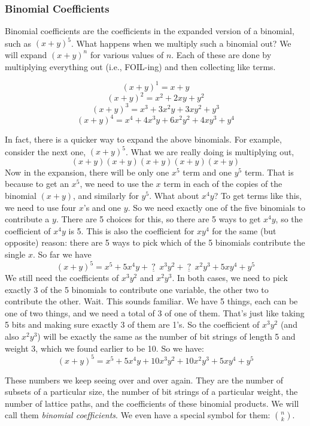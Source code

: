 \documentclass[12pt]{article}
\begin{document}
\subsubsection*{Binomial Coefficients}

Binomial coefficients are the coefficients in the expanded version of a binomial, such as $(x+y)^5$.  What happens when we multiply such a binomial out?  We will expand $(x+y)^n$ for various values of $n$.  Each of these are done by multiplying everything out (i.e., FOIL-ing) and then collecting like terms.

\[(x+y)^1 = x + y\]
\[(x+y)^2 = x^2 + 2xy + y^2\]
\[(x+y)^3 = x^3 + 3x^2y + 3xy^2 + y^3\]
\[(x+y)^4 = x^4 + 4x^3y + 6x^2y^2 + 4xy^3 + y^4\]

In fact, there is a quicker way to expand the above binomials.  For example, consider the next one, $(x+y)^5$.  What we are really doing is multiplying out,
\[(x+y)(x+y)(x+y)(x+y)(x+y)\]
Now in the expansion, there will be only one $x^5$ term and one $y^5$ term.  That is because to get an $x^5$, we need to use the $x$ term in each of the copies of the binomial $(x+y)$, and similarly for $y^5$.  What about $x^4y$?  To get terms like this, we need to use four $x$'s and one $y$.  So we need exactly one of the five binomials to contribute a $y$.  There are 5 choices for this, so there are 5 ways to get $x^4y$, so the coefficient of $x^4y$ is 5.  This is also the coefficient for $xy^4$ for the same (but opposite) reason: there are 5 ways to pick which of the 5 binomials contribute the single $x$.  So far we have
\[(x+y)^5 = x^5 + 5x^4y + \underline{~?~}~x^3y^2 + \underline{~?~}~x^2y^3 + 5 xy^4 + y^5\]
We still need the coefficients of $x^3y^2$ and $x^2y^3$.  In both cases, we need to pick exactly 3 of the 5 binomials to contribute one variable, the other two to contribute the other.  Wait.  This sounds familiar.   We have 5 things, each can be one of two things, and we need a total of 3 of one of them.  That's just like taking 5 bits and making sure exactly 3 of them are 1's.  So the coefficient of $x^3y^2$ (and also $x^2y^3$) will be exactly the same as the number of bit strings of length 5 and weight 3, which we found earlier to be 10.  So we have:
\[(x+y)^5 = x^5 + 5x^4y + 10x^3y^2 + 10x^2y^3 + 5 xy^4 + y^5\]

These numbers we keep seeing over and over again.  They are the number of subsets of a particular size, the number of bit strings of a particular weight, the number of lattice paths, and the coefficients of these binomial products.  We will call them {\em binomial coefficients}.  We even have a special symbol for them: ${n \choose k}$.
\end{document}
